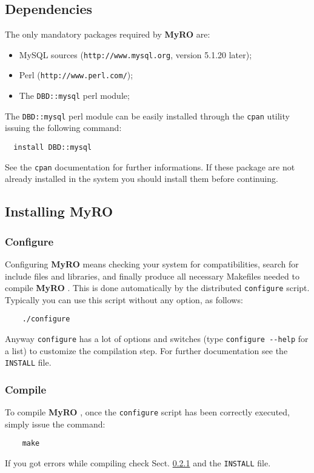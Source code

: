 \documentclass[12pt,titlepage]{article}
\newcommand{\myro}{\textbf{MyRO} }
\begin{document}
\subsection{Dependencies}
\label{sec:Dependencies}
The only mandatory packages required by \myro are:

\begin{itemize}
\item MySQL sources (\verb|http://www.mysql.org|, version 5.1.20 later);
\item Perl (\verb|http://www.perl.com/|);
\item The \verb|DBD::mysql| perl module;
\end{itemize}

\noindent
The \verb|DBD::mysql| perl module can be easily installed through the
\verb|cpan| utility issuing the following command:
%
\begin{verbatim}
  install DBD::mysql
\end{verbatim}
%
See the \verb|cpan| documentation for further informations. If these
package are not already installed in the system you should install
them before continuing.


\subsection{Installing \myro}
\label{sec:installing}

\subsubsection{Configure}
\label{sec:configuremyro}
Configuring \myro means checking your system for compatibilities,
search for include files and libraries, and finally produce all
necessary \textsf{Makefile}s needed to compile \myro. This is done
automatically by the distributed \verb|configure| script. Typically
you can use this script without any option, as follows:

\begin{verbatim}
    ./configure
\end{verbatim}

\noindent
Anyway \verb|configure| has a lot of options and switches (type
\verb|configure --help| for a list) to customize the compilation step.
For further documentation see the \verb|INSTALL| file.

%
\subsubsection{Compile}
\label{sec:compilemyro}
To compile \myro, once the \verb|configure| script has been correctly
executed, simply issue the command:
%
\begin{verbatim}
    make
\end{verbatim}
%
If you got errors while compiling check Sect. \ref{sec:configuremyro}
and the \verb|INSTALL| file.
\end{document}

